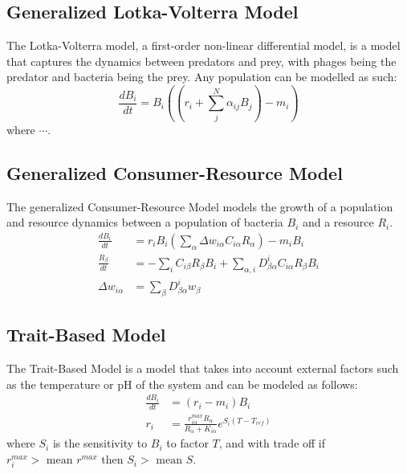 \subsection{Generalized Lotka-Volterra Model}
The Lotka-Volterra model, a first-order non-linear differential model, is a model that captures the dynamics between predators and prey, with phages being the predator and bacteria being the prey.
Any population can be modelled as such:
\[ 
    \frac{d{B}_i}{dt} = {B}_i \left(\left(r_i + \sum_{j}^{N} \alpha_{ij}{B}_j \right) - m_i\right)
\]
where $\cdots$.
 
\subsection{Generalized Consumer-Resource Model}
The generalized Consumer-Resource Model models the growth of a population and resource dynamics between a population of bacteria ${B}_i$ and a resource ${R}_i$. 
\begin{align*}
    \frac{d{B}_i}{dt} &= r_i{B}_i \left(\sum_{\alpha} \Delta w_{i \alpha}C_{i \alpha}R_{\alpha}\right) - m_i {B}_i \\
    \frac{R_{\beta}}{dt} &= -\sum_i C_{i\beta}R_{\beta}{B_i} + \sum_{\alpha, i}D_{\beta\alpha}^{i}C_{i\alpha}R_{\beta}{B}_i \\
    \Delta w_{i\alpha} &= \sum_{\beta}D_{\beta \alpha}^{i}w_{\beta}
\end{align*}

\subsection{Trait-Based Model}
The Trait-Based Model is a model that takes into account external factors such as the temperature or pH of the system and can be modeled as follows: 
\begin{align*}
    \frac{dB_i}{dt} &= \left(r_i - m_i\right) B_i \\
    r_i &= \frac{r_{i\alpha}^{max}R_\alpha}{R_\alpha + K_{i\alpha}}e^{S_i\left(T-T_{ref}\right)}
\end{align*}
where $S_i$ is the sensitivity to $B_i$ to factor $T$, and with trade off if $r_i^{max} > \text{ mean } r^{max} \text{ then } S_i > \text{ mean } S$. 

